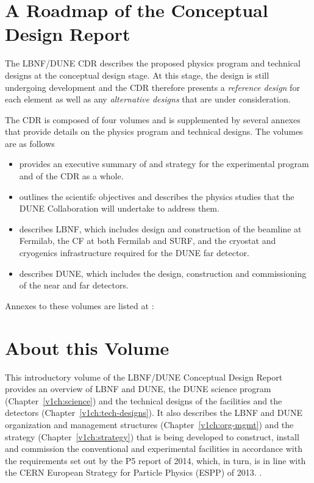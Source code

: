 \section{A Roadmap of the Conceptual Design Report}

The LBNF/DUNE CDR describes the proposed physics program and 
technical designs at the conceptual design stage.  At this stage, the design is
still undergoing development and the CDR therefore presents a \textit{reference design} for each element as well as any 
\textit{alternative designs} that are under consideration.

The CDR is composed of four volumes and is supplemented
by several annexes that provide details on the physics program and technical designs. The volumes are as follows

\begin{itemize}
\item \volintro provides an executive summary of and strategy for the experimental program and of the CDR as a whole.
\item \volphys outlines the scientifc objectives and describes the physics studies that the DUNE Collaboration will undertake to address them.
\item \vollbnf describes LBNF, which includes design and construction of the beamline at Fermilab, the CF at both Fermilab and SURF, and the cryostat and cryogenics infrastructure required for the DUNE far detector.
\item \voldune describes DUNE, which includes the design, construction and commissioning of the near and far detectors. 
\end{itemize}
Annexes to these volumes are listed at :



\section{About this Volume}


This introductory volume of the LBNF/DUNE Conceptual Design Report provides an overview of LBNF and
DUNE, the DUNE science program (Chapter~\ref{v1ch:science}) and the technical designs of the facilities and the detectors 
(Chapter~\ref{v1ch:tech-designs}). It also describes the LBNF and DUNE organization and management structures 
(Chapter~\ref{v1ch:org-mgmt}) and the strategy (Chapter~\ref{v1ch:strategy})  that is being developed to construct, install and commission the conventional and experimental facilities in accordance with the requirements set out by the P5 report of 2014, which, in turn, is in line with the CERN
European Strategy for Particle Physics (ESPP) of 2013. .

